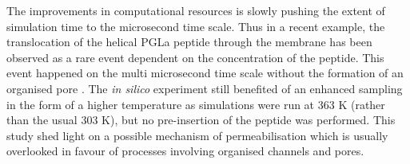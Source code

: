 The improvements in computational resources is slowly pushing the extent of simulation time to the microsecond time scale.
%
Thus in a recent example, the translocation of the helical PGLa peptide through the membrane has been observed as a rare event dependent on the concentration of the peptide. This event happened on the multi microsecond time scale without the formation of an organised pore \citep{Ulmschneider2017}. The \emph{in silico} experiment still benefited of an enhanced sampling in the form of a higher temperature as simulations were run at 363 K (rather than the usual 303 K), but no pre-insertion of the peptide was performed. This study shed light on a possible mechanism of permeabilisation which is usually overlooked in favour of processes involving organised channels and pores. 

